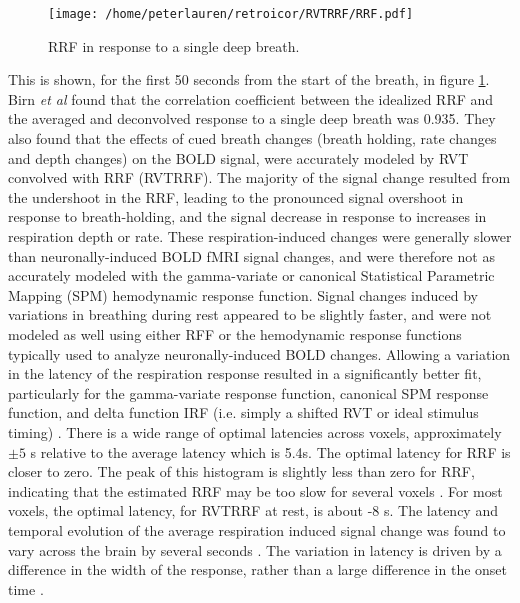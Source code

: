 \documentclass[twoside,twocolumn]{article}
\begin{document}
\begin{figure}[htb]
	\begin{center}
		\texttt{[image: /home/peterlauren/retroicor/RVTRRF/RRF.pdf]}
		\caption{RRF in response to a single deep breath.}
		\label{fig:RRF}
	\end{center}
\end{figure}

This is shown, for the first 50 seconds from the start of the breath, in figure \ref{fig:RRF}.  Birn {\em et al} found that the correlation coefficient between the idealized RRF and the averaged and deconvolved response to a single deep breath was 0.935. They also found that the effects of cued breath changes (breath holding, rate changes and depth changes) on the BOLD signal, were accurately modeled by RVT convolved with RRF (RVTRRF). The majority of the signal change resulted from the undershoot in the RRF, leading to the pronounced signal overshoot in response to breath-holding, and the signal decrease in response to increases in respiration depth or rate. These respiration-induced changes were generally slower than neuronally-induced BOLD fMRI signal changes, and were therefore not as accurately modeled with the gamma-variate or canonical Statistical Parametric Mapping (SPM) hemodynamic response function.  Signal changes induced by variations in breathing during rest appeared to be slightly faster, and were not modeled as well using either RFF or the hemodynamic response functions typically used to analyze neuronally-induced BOLD changes. Allowing a variation in the latency of the respiration response resulted in a significantly better fit, particularly for the gamma-variate response function, canonical SPM response function, and delta function IRF (i.e. simply a shifted RVT or ideal stimulus timing) \cite{Birn2008}.  There is a wide range of optimal latencies across voxels, approximately $\pm 5$ s relative to the average latency which is 5.4s\cite{Birn2012}.  The optimal latency for RRF is closer to zero. The peak of this histogram is slightly less than zero for RRF, indicating that the estimated RRF may be too slow for several voxels \cite{Birn2008}.  For most voxels, the optimal latency, for RVTRRF at rest, is about -8 s.  The latency and temporal evolution of the average respiration induced signal change was found to vary across the brain by several seconds \cite{Birn2008}.  The variation in latency is driven by a difference in the width of the response, rather than a large difference in the onset time \cite{Birn2008}. 
 
\end{document}
